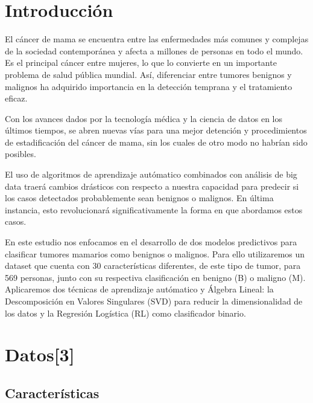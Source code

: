 \documentclass[a4paper,10pt,twocolumn]{article}
\begin{document}
\section{Introducción}\label{sec:intro}
  El cáncer de mama se encuentra entre las enfermedades más comunes y complejas de la sociedad contemporánea y afecta a millones de personas en todo el mundo. Es el principal cáncer entre mujeres, lo que lo convierte en un importante problema de salud pública mundial. Así, diferenciar entre tumores benignos y malignos ha adquirido importancia en la detección temprana y el tratamiento eficaz.

Con los avances dados por la tecnología médica y la ciencia de datos en los últimos tiempos, se abren nuevas vías para una mejor detención y procedimientos de estadificación del cáncer de mama, sin los cuales de otro modo no habrían sido posibles.

El uso de algoritmos de aprendizaje autómatico combinados con análisis de big data traerá cambios drásticos con respecto a nuestra capacidad para predecir si los casos detectados probablemente sean benignos o malignos. En última instancia, esto revolucionará significativamente la forma en que abordamos estos casos.

En este estudio nos enfocamos en el desarrollo de dos modelos predictivos para clasificar tumores mamarios como benignos o malignos. Para ello utilizaremos un dataset que cuenta con 30 características diferentes, de este tipo de tumor, para 569 personas, junto con su respectiva clasificación en benigno (B) o maligno (M). Aplicaremos dos técnicas de aprendizaje autómatico y Álgebra Lineal: la Descomposición en Valores Singulares (SVD) para reducir la dimensionalidad de los datos y la Regresión Logística (RL) como clasificador binario.




\section{Datos[3]}\label{sec:dev}
\subsection{Características}
\end{document}
